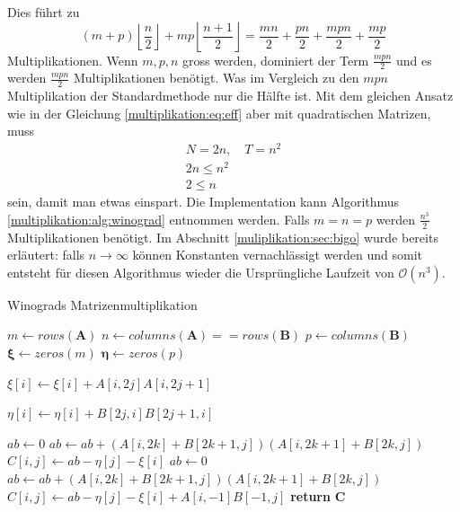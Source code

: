 Dies f\"uhrt zu
\begin{equation}
		(m+p) \left \lfloor \frac{n}{2} \right \rfloor + mp \left \lfloor \frac{n+1}{2} \right \rfloor = \frac{mn}{2} + \frac{pn}{2} + \frac{mpn}{2} + \frac{mp}{2}
\end{equation}
Multiplikationen.
Wenn $m,p,n$ gross werden, dominiert der Term $\frac{mpn}{2}$ und es werden $\frac{mpn}{2}$ Multiplikationen ben\"otigt.
Was im Vergleich zu den $mpn$ Multiplikation der Standardmethode nur die H\"alfte ist.
Mit dem gleichen Ansatz wie in der Gleichung \ref{multiplikation:eq:eff} aber mit quadratischen Matrizen, muss
\begin{equation}
	\begin{split}
N=2n, \quad T = n^2 \\
	2n \leq n^2 \\
	2 \leq n
\end{split}
\end{equation}
sein, damit man etwas einspart.
Die Implementation kann Algorithmus \ref{multiplikation:alg:winograd} entnommen werden.
Falls $m=n=p$ werden $\frac{n^3}{2}$ Multiplikationen benötigt.
Im Abschnitt \ref{muliplikation:sec:bigo} wurde bereits erläutert: falls $n \rightarrow \infty$ können Konstanten vernachlässigt werden und
 somit entsteht für diesen Algorithmus wieder die Ursprüngliche Laufzeit von $\mathcal{O}(n^3 )$.
\begin{algorithm}\footnotesize\caption{Winograds Matrizenmultiplikation}
	\setlength{\lineskip}{7pt}
	\label{multiplikation:alg:winograd}
	\begin{algorithmic}
		\State  $ m \gets rows(\mathbf{A})$
		\State  $ n \gets columns(\mathbf{A}) == rows(\mathbf{B})$
		\State  $ p \gets columns(\mathbf{B})$
		\State  $ \mathbf{\xi} \gets zeros(m)$
		\State  $ \mathbf{\eta} \gets zeros(p)$


		\State $\xi[i] \gets \xi[i]+A[i,2 j]A[i,2 j+1]$
		\EndFor
		\EndFor

		\State $\eta[i] \gets   \eta[i]+B[2 j,i]B[2 j+1,i]$
		\EndFor
		\EndFor

		\State $ab \gets 0$
		\State $ab \gets ab + (A[i,2k]+B[2k+1,j])(A[i,2k+1]+B[2k,j])$
		\EndFor
		\State $C[i,j] \gets ab-\eta[j]-\xi[i]$
		\EndFor
		\EndFor
    \Else
		\State $ab \gets 0$
		\State $ab \gets ab + (A[i,2k]+B[2k+1,j])(A[i,2k+1]+B[2k,j])$
		\EndFor
		\State $C[i,j] \gets ab-\eta[j]-\xi[i]+A[i,-1]B[-1,j]$
		\EndFor
		\EndFor
		\EndIf
		\State \textbf{return} $\textbf{C}$

		\EndFunction
	\end{algorithmic}
\end{algorithm}


